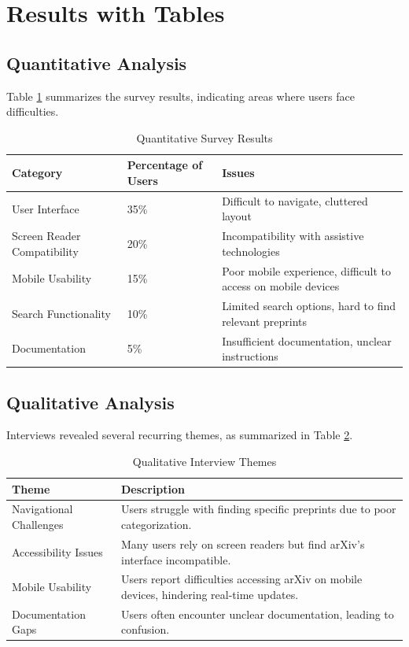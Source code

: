 \documentclass{article}
\begin{document}
\section{Results with Tables}
\subsection{Quantitative Analysis}
Table \ref{tab:quantitative} summarizes the survey results, indicating areas where users face difficulties.

\begin{table}[htbp]
\centering
\caption{Quantitative Survey Results}
\label{tab:quantitative}
\begin{tabular}{@{}lll@{}}
\toprule
\textbf{Category} & \textbf{Percentage of Users} & \textbf{Issues} \\ \midrule
User Interface & 35\% & Difficult to navigate, cluttered layout \\
Screen Reader Compatibility & 20\% & Incompatibility with assistive technologies \\
Mobile Usability & 15\% & Poor mobile experience, difficult to access on mobile devices \\
Search Functionality & 10\% & Limited search options, hard to find relevant preprints \\
Documentation & 5\% & Insufficient documentation, unclear instructions \\ \bottomrule
\end{tabular}
\end{table}

\subsection{Qualitative Analysis}
Interviews revealed several recurring themes, as summarized in Table \ref{tab:qualitative}.

\begin{table}[htbp]
\centering
\caption{Qualitative Interview Themes}
\label{tab:qualitative}
\begin{tabular}{@{}ll@{}}
\toprule
\textbf{Theme} & \textbf{Description} \\ \midrule
Navigational Challenges & Users struggle with finding specific preprints due to poor categorization. \\
Accessibility Issues & Many users rely on screen readers but find arXiv's interface incompatible. \\
Mobile Usability & Users report difficulties accessing arXiv on mobile devices, hindering real-time updates. \\
Documentation Gaps & Users often encounter unclear documentation, leading to confusion. \\ \bottomrule
\end{tabular}
\end{table}
\end{document}
